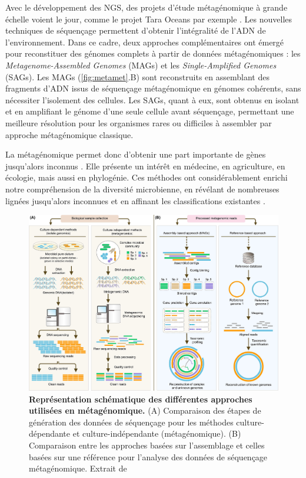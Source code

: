 Avec le développement des NGS, des projets d'étude métagénomique à grande échelle voient le jour, comme le projet Tara Oceans par exemple \cite{karsenti_holistic_2011}. Les nouvelles techniques de séquençage permettent d'obtenir l'intégralité de l'ADN de l'environnement. Dans ce cadre, deux approches complémentaires ont émergé pour reconstituer des génomes complets à partir de données métagénomiques \cite{chang_genomic_2024}: les \textit{Metagenome-Assembled Genomes} (MAGs) et les \textit{Single-Amplified Genomes} (SAGs). Les MAGs (\autoref{fig:metamet}.B) sont reconstruits en assemblant des fragments d’ADN issus de séquençage métagénomique en génomes cohérents, sans nécessiter l’isolement des cellules. Les SAGs, quant à eux, sont obtenus en isolant et en amplifiant le génome d’une seule cellule avant séquençage, permettant une meilleure résolution pour les organismes rares ou difficiles à assembler par approche métagénomique classique.

La métagénomique permet donc d'obtenir une part importante de gènes jusqu'alors inconnus \cite{bickhart_generating_2022,rinke_insights_2013}. Elle présente un intérêt en médecine, en agriculture, en écologie, mais aussi en phylogénie. Ces méthodes ont considérablement enrichi notre compréhension de la diversité microbienne, en révélant de nombreuses lignées jusqu'alors inconnues et en affinant les classifications existantes \cite{hug_new_2016}.

\begin{figure}[htbp]
    \centering
    \includegraphics[width=.9\textwidth]{images/metagenomic.png}
    \caption[Représentation schématique des différentes approches utilisées en métagénomique]{\textbf{Représentation schématique des différentes approches utilisées en métagénomique.} (A) Comparaison des étapes de génération des données de séquençage pour les méthodes culture-dépendante et culture-indépendante (métagénomique). (B) Comparaison entre les approches basées sur l’assemblage et celles basées sur une référence pour l’analyse des données de séquençage métagénomique. Extrait de \cite{yang_review_2021}}
    \label{fig:metamet}
\end{figure}

